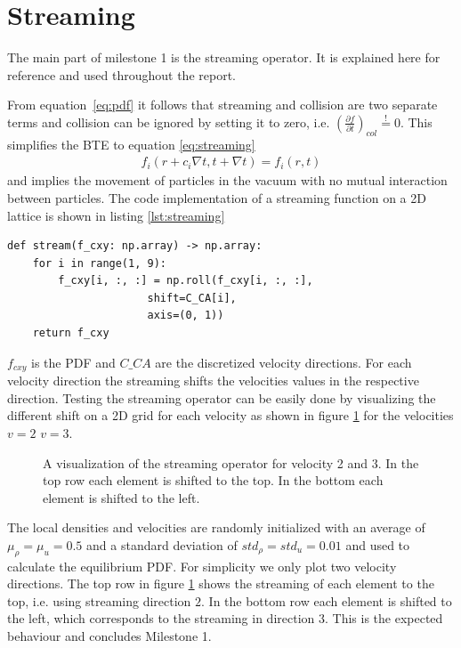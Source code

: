 \documentclass[a4paper,12pt, oneside]{book}
\begin{document}
\section{Streaming}
The main part of milestone 1 is the streaming operator. It is explained here for reference and used throughout the report. 

From equation~\ref{eq:pdf} it follows that streaming and collision are two separate terms and collision can be ignored by setting it to zero, i.e. $\left( \frac{\partial f}{\partial t} \right)_{col} \overset{!}{=} 0$.
This simplifies the BTE to equation \ref{eq:streaming} 
\begin{equation}
  \label{eq:streaming}
  \begin{aligned}
    f_{i}(r+c_{i} \nabla t,t+\nabla t)=f_{i}(r,t)
  \end{aligned}
\end{equation}
and implies the movement of particles in the vacuum with no mutual interaction between particles.
The code implementation of a streaming function on a 2D lattice is shown in listing \ref{lst:streaming}
\begin{center}
\begin{lstlisting}[caption=Implementation of the streaming operator,label=lst:streaming, basicstyle=\small]
def stream(f_cxy: np.array) -> np.array:
    for i in range(1, 9):
        f_cxy[i, :, :] = np.roll(f_cxy[i, :, :], 
                      shift=C_CA[i], 
                      axis=(0, 1))
    return f_cxy
  \end{lstlisting}
\end{center}
$f_{cxy}$ is the PDF and $C \_ CA$ are the discretized velocity directions.
For each velocity direction the streaming shifts the velocities values in the respective direction.
Testing the streaming operator can be easily done by visualizing the different shift on a 2D grid for each velocity as shown in figure \ref{fig:m1-shifting} for the velocities $v=2$ $v=3$.
\begin{figure}[ht]
\centering
\resizebox{\columnwidth}{!}{\large}
\vspace*{-10mm}
\caption[Visualization of the streaming]{A visualization of the streaming operator for velocity 2 and 3. In the top row each element is shifted to the top. In the bottom  each element is shifted to the left.}
\label{fig:m1-shifting}
\end{figure}
The local densities and velocities are randomly initialized with an average of $\mu_{\rho}=\mu_{u}=0.5$ and a standard deviation of $std_{\rho}=std_{u}=0.01$ and used to calculate the equilibrium PDF.
For simplicity we only plot two velocity directions.
The top row in figure \ref{fig:m1-shifting} shows the streaming of each element to the top, i.e. using streaming direction $2$. In the bottom row each element is shifted to the left, which corresponds to the streaming in direction $3$.
This is the expected behaviour and concludes Milestone 1.
\end{document}
